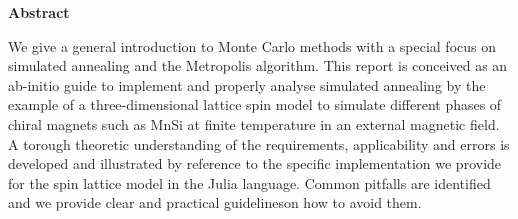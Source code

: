 %
\phantom{}
\bigskip
\bigskip
\bigskip
%
\begin{center}
{\sffamily \bfseries \huge Abstract}
\end{center}
%
\bigskip
\bigskip
%
We give a general introduction to Monte Carlo methods with a special focus on
simulated annealing and the Metropolis algorithm. This report is conceived as an
ab-initio guide to implement and properly analyse simulated annealing by the
example of a three-dimensional lattice spin model to simulate different phases
of chiral magnets such as MnSi at finite temperature in an external magnetic
field. A torough theoretic understanding of the requirements, applicability and
errors is developed and illustrated by reference to the specific implementation
we provide for the spin lattice model in the Julia language. Common pitfalls are
identified and we provide clear and practical guidelineson how to avoid them.
